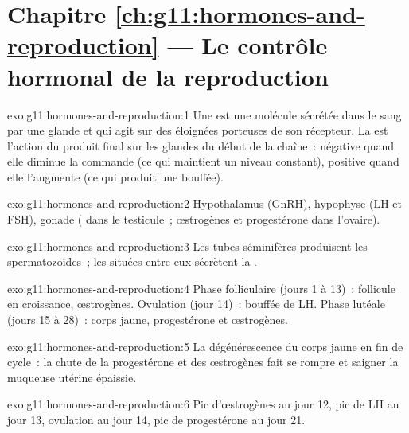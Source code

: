 \section*{Chapitre \ref{ch:g11:hormones-and-reproduction} --- Le contrôle hormonal de la reproduction}

\begin{solution}{exo:g11:hormones-and-reproduction:1}
Une  est une molécule sécrétée dans le sang par une glande et
qui agit sur des  éloignées porteuses de son récepteur. La
 est l'action du produit final sur les glandes du début de
la chaîne~: négative quand elle diminue la commande (ce qui maintient
un niveau constant), positive quand elle l'augmente (ce qui produit une
bouffée).
\end{solution}

\begin{solution}{exo:g11:hormones-and-reproduction:2}
Hypothalamus (GnRH), hypophyse (LH et FSH), gonade ( dans
le testicule~; œstrogènes et progestérone dans l'ovaire).
\end{solution}

\begin{solution}{exo:g11:hormones-and-reproduction:3}
Les tubes séminifères produisent les spermatozoïdes~; les 
situées entre eux sécrètent la .
\end{solution}

\begin{solution}{exo:g11:hormones-and-reproduction:4}
Phase folliculaire (jours 1 à 13)~: follicule en croissance,
œstrogènes. Ovulation (jour 14)~: bouffée de LH. Phase lutéale (jours
15 à 28)~: corps jaune, progestérone et œstrogènes.
\end{solution}

\begin{solution}{exo:g11:hormones-and-reproduction:5}
La dégénérescence du corps jaune en fin de cycle~: la chute de la
progestérone et des œstrogènes fait se rompre et saigner la muqueuse
utérine épaissie.
\end{solution}

\begin{solution}{exo:g11:hormones-and-reproduction:6}
Pic d'œstrogènes au jour 12, pic de LH au jour 13, ovulation au jour
14, pic de progestérone au jour 21.
\end{solution}

